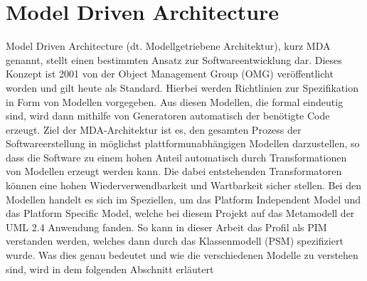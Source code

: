 \section{Model Driven Architecture} \label{MDA}
Model Driven Architecture (dt. Modellgetriebene Architektur), kurz MDA genannt, stellt
einen bestimmten Ansatz zur Softwareentwicklung dar. Dieses Konzept ist 2001 von der
Object Management Group (OMG) veröffentlicht worden und gilt heute als
Standard. Hierbei werden Richtlinien zur Spezifikation in Form von Modellen vorgegeben.
Aus diesen Modellen, die formal eindeutig sind, wird dann mithilfe von Generatoren
automatisch der benötigte Code erzeugt. Ziel der MDA-Architektur ist es, den gesamten Prozess der Softwareerstellung in möglichst plattformunabhängigen Modellen darzustellen, so dass die Software zu einem hohen Anteil automatisch durch Transformationen von Modellen erzeugt werden kann. Die dabei entstehenden Transformatoren können eine hohen Wiederverwendbarkeit und Wartbarkeit sicher stellen. 
Bei den Modellen handelt es sich im Speziellen, um das Platform Independent Model und das Platform Specific Model, welche bei diesem Projekt auf das Metamodell der UML 2.4 Anwendung fanden. So kann in dieser Arbeit das Profil als PIM verstanden werden, welches dann durch das Klassenmodell (PSM) spezifiziert wurde.
Was dies genau bedeutet und wie die verschiedenen Modelle zu verstehen sind, wird in dem folgenden Abschnitt erläutert
